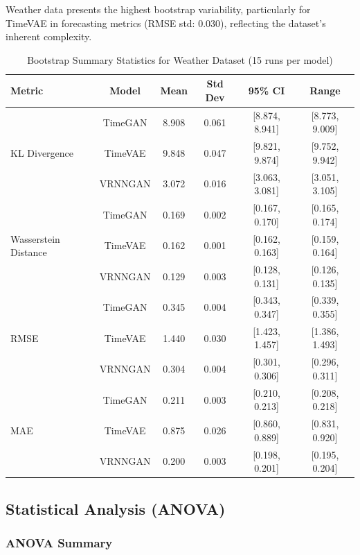 \documentclass{article}
\begin{document}
Weather data presents the highest bootstrap variability, particularly for TimeVAE in forecasting metrics (RMSE std: 0.030), reflecting the dataset's inherent complexity.

\begin{table}[H]
    \centering
    \caption{Bootstrap Summary Statistics for Weather Dataset (15 runs per model)}
    \label{tab:bootstrap_weather}
    \small
    \begin{tabular}{lccccc}
        \toprule
        \textbf{Metric} & \textbf{Model} & \textbf{Mean} & \textbf{Std Dev} & \textbf{95\% CI} & \textbf{Range} \\
        \midrule
        \multirow{3}{*}{KL Divergence} 
    & TimeGAN   & 8.908 & 0.061 & [8.874, 8.941] & [8.773, 9.009] \\
    & TimeVAE   & 9.848 & 0.047 & [9.821, 9.874] & [9.752, 9.942] \\
    & VRNNGAN   & 3.072 & 0.016 & [3.063, 3.081] & [3.051, 3.105] \\
    \midrule
    \multirow{3}{*}{Wasserstein Distance} 
    & TimeGAN   & 0.169 & 0.002 & [0.167, 0.170] & [0.165, 0.174] \\
    & TimeVAE   & 0.162 & 0.001 & [0.162, 0.163] & [0.159, 0.164] \\
    & VRNNGAN   & 0.129 & 0.003 & [0.128, 0.131] & [0.126, 0.135] \\
    \midrule
    \multirow{3}{*}{RMSE} 
    & TimeGAN   & 0.345 & 0.004 & [0.343, 0.347] & [0.339, 0.355] \\
    & TimeVAE   & 1.440 & 0.030 & [1.423, 1.457] & [1.386, 1.493] \\
    & VRNNGAN   & 0.304 & 0.004 & [0.301, 0.306] & [0.296, 0.311] \\
    \midrule
    \multirow{3}{*}{MAE} 
    & TimeGAN   & 0.211 & 0.003 & [0.210, 0.213] & [0.208, 0.218] \\
    & TimeVAE   & 0.875 & 0.026 & [0.860, 0.889] & [0.831, 0.920] \\
    & VRNNGAN   & 0.200 & 0.003 & [0.198, 0.201] & [0.195, 0.204] \\
    \bottomrule
\end{tabular}
\end{table}

\subsection{Statistical Analysis (ANOVA)}



\subsubsection{ANOVA Summary}
\end{document}
